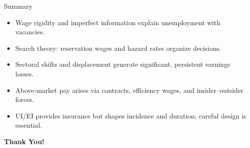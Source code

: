 \documentclass[aspectratio=169]{beamer}
\begin{document}
\begin{frame}{Summary}
\transfade
\begin{itemize}[<+->]
  \item Wage rigidity and imperfect information explain unemployment with vacancies.
  \item Search theory: reservation wages and hazard rates organize decisions.
  \item Sectoral shifts and displacement generate significant, persistent earnings losses.
  \item Above-market pay arises via contracts, efficiency wages, and insider--outsider forces.
  \item UI/EI provides insurance but shapes incidence and duration; careful design is essential.
\end{itemize}
\end{frame}

\begin{frame}
\centering
\Huge{\textbf{Thank You!}} \\

\end{frame}
\end{document}
